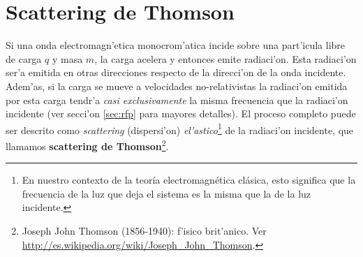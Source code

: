 \section{Scattering de Thomson}



Si una onda electromagn'etica monocrom'atica incide
sobre una part'icula libre de carga $q$ y masa $m$, la carga acelera y
entonces emite radiaci'on. Esta radiaci'on ser'a emitida en otras
direcciones respecto de la direcci'on de la onda incidente. Adem'as, si la carga se mueve a velocidades no-relativistas la radiaci'on emitida por esta carga tendr'a \textit{casi exclusivamente} la misma frecuencia que la radiaci'on incidente (ver secci'on \ref{sec:rfp} para mayores detalles). El proceso completo puede ser descrito como \textit{scattering} (dispersi'on) \textit{el'astico}\footnote{En nuestro contexto de la teoría electromagnética clásica, esto significa que la frecuencia de la luz que deja el sistema es la misma que la de la luz incidente.} de la radiaci'on incidente, que llamamos \textbf{scattering de Thomson}\footnote{Joseph John Thomson (1856-1940): f'isico brit'anico. Ver \url{http://es.wikipedia.org/wiki/Joseph_John_Thomson}.}.

